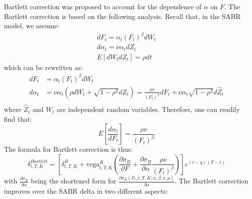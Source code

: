 \documentclass[letterpaper,12pt,titlepage,oneside,final]{book}
\numberwithin{equation}{section}
\theoremstyle{definition}
\begin{document}
Bartlett correction \cite{hagan2017bartlett,bartlett2006hedging} was proposed to account for the dependence of $\alpha$ on $F$.
The Bartlett correction is based on the following analysis. Recall that, in the SABR model, we assume:
\[
\begin{split}
dF_t=\alpha_t (F_t)^{\beta}dW_t\\
d\alpha_t=\nu \alpha_t dZ_t\\
E[dW_tdZ_t]=\rho dt
\end{split}
\]
which can be rewritten as:
\[
\begin{split}
dF_t&=\alpha_t (F_t)^{\beta}dW_t\\
d\alpha_t&=\nu \alpha_t \left(\rho dW_t +\sqrt{1-\rho^2} d\hat{Z}_t\right)=\frac{\rho \nu }{(F_t)^{\beta}}dF_t+\nu \alpha_t \sqrt{1-\rho^2} d\hat{Z}_t\\
\end{split}
\]
where  $\hat{Z}_t$ and $W_t$ are independent random variables.
Therefore, one can readily find that:
\[
   E\left[ \frac{d\alpha_t}{dF_t}\right] =\frac{\rho \nu }{(F_t)^{\beta}}
\]
The formula for Bartlett correction is thus:
\begin{equation}
\delta^{Bartlett}_{t,T,K}=\left[ 
    \delta^{B}_{t,T,K}+\text{vega}^{B}_{t,T,K} 
    \left(\frac{\partial \sigma_B}{\partial F}+ \frac{\partial \sigma_B}{\partial \alpha}\frac{\rho \nu }{(F_t)^{\beta}}\right)
\right]e^{(r-q) (T-t)}
\label{eq:bartlett}
\end{equation}
with $\frac{\partial \sigma_B}{\partial \alpha}$ being the shortened form for 
$\frac{\partial \sigma_B (F_t,t,T,K;\alpha,\beta,\nu,\rho)}{\partial \alpha}$.
The Bartlett correction improves over the SABR delta in two different aspects:
\end{document}
